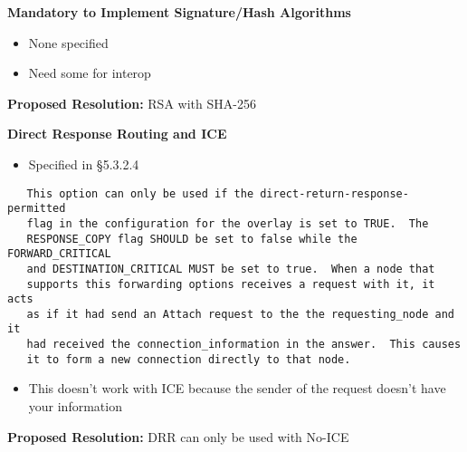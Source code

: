 \documentclass[helvetica]{seminar}
\newcommand{\heading}[1]{%
  \begin{center} 
    \large\bf 
    #1 
  \end{center} 
  \vspace{.4 in}}
\begin{document}
\begin{slide}
\heading{Mandatory to Implement Signature/Hash Algorithms}

\begin{itemize}
\item None specified
\item Need some for interop
\end{itemize}

\vspace{1em}
\textbf{Proposed Resolution:} RSA with SHA-256
\end{slide}




\begin{slide}
\heading{Direct Response Routing and ICE}

\begin{itemize}
\item Specified in \S 5.3.2.4
\end{itemize}


{\footnotesize
\begin{verbatim}
   This option can only be used if the direct-return-response-permitted
   flag in the configuration for the overlay is set to TRUE.  The
   RESPONSE_COPY flag SHOULD be set to false while the FORWARD_CRITICAL
   and DESTINATION_CRITICAL MUST be set to true.  When a node that
   supports this forwarding options receives a request with it, it acts
   as if it had send an Attach request to the the requesting_node and it
   had received the connection_information in the answer.  This causes
   it to form a new connection directly to that node. 
\end{verbatim}
}

\begin{itemize}
\item This doesn't work with ICE because the sender of the request
  doesn't have your information
\end{itemize}

\vspace{1em}
\textbf{Proposed Resolution:} DRR can only be used with No-ICE
\end{slide}
\end{document}
